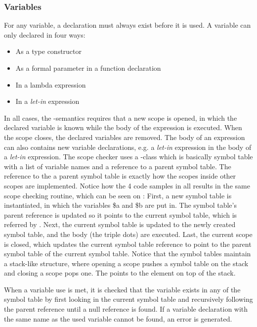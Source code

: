 \subsubsection{Variables}
For any variable, a declaration must always exist before it is used. A variable can only declared in four ways:
\begin{itemize}
\item As a type constructor
\item As a formal parameter in a function declaration
\item In a lambda expression
\item In a \textit{let-in} expression
\end{itemize}
In all cases, the \productname{}-semantics requires that a new scope is opened, in which the declared variable is known while the body of the expression is executed. When the scope closes, the declared variables are removed. The body of an expression can also contains new variable declarations, e.g. a \textit{let-in} expression in the body of a \textit{let-in} expression. The scope checker uses a -class which is basically symbol table with a list of variable names and a reference to a parent symbol table. The reference to the a parent symbol table is exactly how the scopes inside other scopes are implemented. Notice how the 4 code samples in  all results in the same scope checking routine, which can be seen on : First, a new symbol table is instantiated, in which the variables \$a and \$b are put in. The symbol table's parent reference is updated so it points to the current symbol table, which is referred by  . Next, the current symbol table is updated to the newly created symbol table, and the body (the triple dots) are executed. Last, the current scope is closed, which updates the current symbol table reference to point to the parent symbol table of the current symbol table. Notice that the symbol tables maintain a stack-like structure, where opening a scope pushes a symbol table on the stack and closing a scope pops one. The   points to the element on top of the stack.

When a variable use is met, it is checked that the variable exists in any of the symbol table by first looking in the current symbol table and recursively following the parent reference until a null reference is found. If a variable declaration with the same name as the used variable cannot be found, an error is generated.


